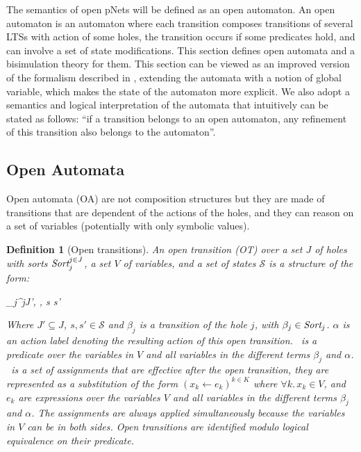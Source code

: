 \documentclass{lmcs}
\newcommand{\TODO}[1]{\textcolor{red}{\textbf{[TODO:#1]}}}
\newtheorem{definition}{Definition}
\begin{document}
The semantics of open pNets will be defined  as an open automaton. An open
automaton is an automaton where each transition composes transitions of several LTSs with
action of some holes, the transition occurs if some predicates hold, and can involve a 
set of state modifications. This section defines open automata and a bisimulation theory for them. This section can be viewed as an improved version of the formalism described in \cite{henrio:Forte2016}, extending the automata with a notion of global variable, which makes the state of the automaton more explicit. We also adopt a semantics and logical interpretation of the automata that intuitively can be stated as follows: ``if a transition belongs to an open automaton, any refinement of this transition also belongs to the automaton''.

\subsection{Open Automata}
 Open automata (OA) are not composition structures but they are made of transitions that are dependent of the actions of the holes, and they can reason on a set of variables (potentially with only symbolic values). 
\begin{definition}[Open transitions]\label{def:OT}
	\label{def:OpenTransitions}
	An \emph{open transition} (OT) over a
	set $J$ of holes with sorts $\Sort_j^{j\in J}$, a set $V$ of variables, and a set of states $\mathcal{S}$ is 
	a structure of the form:	
	\begin{mathpar}
	\openrule
	{	\beta_j^{j\in J'}, \Pred, \Post}
	{s \OTarrow {\alpha}s'}
	\end{mathpar}
	Where $J'\subseteq J$, $s, s'\in\mathcal{S}$ and $\beta_j$
        is a transition of the hole $j$, with $\beta_j\in\Sort_j$. $\alpha$ is an action 
        label denoting the resulting action of this open transition.
        \Pred\ is a predicate over the  variables in $V$ and all variables
        in the different terms
       $\beta_j$ and $\alpha$. \Post\ is a set of 
	assignments that are effective after the open transition, they are
        represented as a substitution of the form $({x_k\gets e_k})^{k\in K}$ 
	where $\forall k.\, x_k\in V$, and $e_k$ are expressions
        over the variables $V$ and all variables
        in the different terms
       $\beta_j$ and $\alpha$. The assignments are always applied simultaneously because the variables in $V$ can be in both sides. Open transitions are identified
        modulo logical equivalence on their predicate. 
\end{definition}
\end{document}
